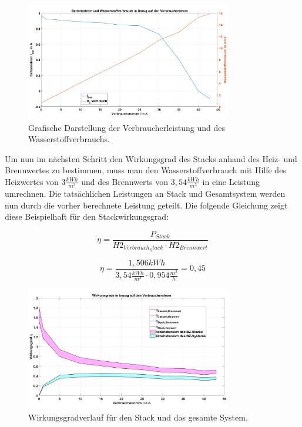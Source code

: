 \begin{figure}[H]
  \centering
  \includegraphics[width=0.8\textwidth]{Abbildungen/Aufgabe63_Leistungen_Ibat Vdot.png}
  \caption{Grafische Darstellung der Verbraucherleistung und des Wasserstoffverbrauchs.}
  \label{fig:230626_Ibat_Vdot}
\end{figure}

Um nun im nächsten Schritt den Wirkungsgrad des Stacks anhand des Heiz- und Brennwertes zu bestimmen, 
muss man den Wasserstoffverbrauch mit Hilfe des Heizwertes von $3 \frac{kWh}{m^3}$ und des Brennwerts von $3,54 \frac{kWh}{m^3}$ in eine Leistung umrechnen. 
Die tatsächlichen Leistungen an Stack und Gesamtsystem werden nun durch die vorher berechnete Leistung geteilt. 
Die folgende Gleichung zeigt diese Beispielhaft für den Stackwirkungsgrad:

\begin{equation}
 \eta= \frac{P_{Stack}}{H2_{Verbrauch_Stack}\cdot H2_{Brennwert}}
  \label{eq:230627_Beispiel_wirkungsgrad_Berechnung}
\end{equation}

$$\eta= \frac{1,506 kWh}{3,54 \frac{kWh}{m^3 }\cdot 0,954 \frac{m^3}{h}}=0,45$$

\begin{figure}[H]
    \centering
    \includegraphics[width=0.8\textwidth]{Abbildungen/Aufgabe63_Wirkungsgrade.png}
    \caption{Wirkungsgradverlauf für den Stack und das gesamte System.}
    \label{fig:230626_Wirkungsgrade}
\end{figure}

